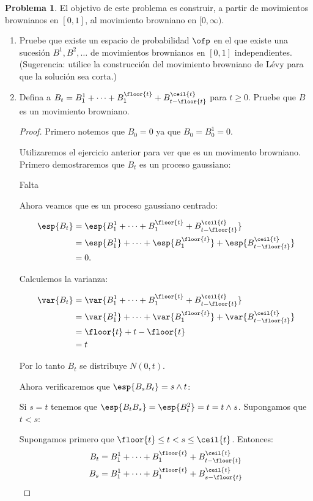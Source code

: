 \documentclass[a5paper,oneside]{amsart}
\theoremstyle{plain}
\theoremstyle{definition}
\newtheorem{problema}{Problema}
\begin{document}
\begin{problema}
El objetivo de este problema es construir, a partir de movimientos brownianos en $[0,1]$, al movimiento browniano en $[0,\infty)$.
\begin{enumerate}
\item Pruebe que existe un espacio de probabilidad $\ofp$ en el que existe una sucesi\'on $B^1,B^2,\ldots$ de movimientos brownianos en $[0,1]$ independientes. (Sugerencia: utilice la construcci\'on del movimiento browniano de L\'evy  para que la soluci\'on sea corta.)
\item Defina a $B_t=B^1_1+\cdots+B^{\floor{t}}_1+B^{\ceil{t}}_{t-\floor{t}}$ para $t\geq 0$. Pruebe que $B$ es un movimiento browniano. 

\begin{proof}
Primero notemos que $B_0=0$ ya que $B_0=B_{0}^1=0$.

Utilizaremos el ejercicio anterior para ver que es un movimento browniano. Primero demostraremos que $B_t$ es un proceso gaussiano:

Falta

Ahora veamos que es un proceso gaussiano centrado:

\begin{align}
\esp{B_t}&=\esp{B^1_1+\cdots+B^{\floor{t}}_1+B^{\ceil{t}}_{t-\floor{t}}}\notag \\
&=\esp{B^1_1}+\cdots+\esp{B^{\floor{t}}_1}+\esp{B^{\ceil{t}}_{t-\floor{t}}} \notag \\
&=0.
\end{align}

Calculemos la varianza:

\begin{align}
\var{B_t}&=\var{B^1_1+\cdots+B^{\floor{t}}_1+B^{\ceil{t}}_{t-\floor{t}}}\notag \\
&=\var{B^1_1}+\cdots+\var{B^{\floor{t}}_1}+\var{B^{\ceil{t}}_{t-\floor{t}}} \notag \\
&=\floor{t}+t-\floor{t}\notag \\
&=t\notag
\end{align}

Por lo tanto $B_t$ se distribuye $N(0,t)$.

Ahora verificaremos que $\esp{B_sB_t}=s\wedge t$:

Si $s=t$ tenemos que $\esp{B_tB_s}=\esp{B_t^2}=t=t\wedge s$.
Supongamos que $t<s$:

Supongamos primero que $\floor{t}\leq t<s\leq\ceil{t}$. Entonces:
\begin{align}
B_t&=B^1_1+\cdots+B^{\floor{t}}_1+B^{\ceil{t}}_{t-\floor{t}}\notag \\
B_s&=B^1_1+\cdots+B^{\floor{t}}_1+B^{\ceil{t}}_{s-\floor{t}}\notag
\end{align}


\end{proof}
\end{enumerate}
\end{problema}
\end{document}
